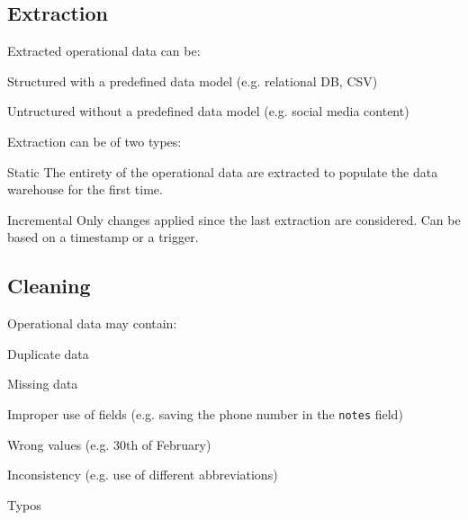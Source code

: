 \subsection{Extraction}

Extracted operational data can be:
\begin{descriptionlist}
    \item[Structured] 
        with a predefined data model (e.g. relational DB, CSV)

    \item[Untructured] 
        without a predefined data model (e.g. social media content)
\end{descriptionlist}

Extraction can be of two types:
\begin{descriptionlist}
    \item[Static] 
        The entirety of the operational data are extracted to populate the
        data warehouse for the first time.
    
    \item[Incremental] 
        Only changes applied since the last extraction are considered.
        Can be based on a timestamp or a trigger.
\end{descriptionlist}


\subsection{Cleaning}

Operational data may contain:
\begin{descriptionlist}
    \item[Duplicate data] 
    \item[Missing data] 
    \item[Improper use of fields] (e.g. saving the phone number in the \texttt{notes} field)
    \item[Wrong values] (e.g. 30th of February)
    \item[Inconsistency] (e.g. use of different abbreviations)
    \item[Typos]    
\end{descriptionlist}

